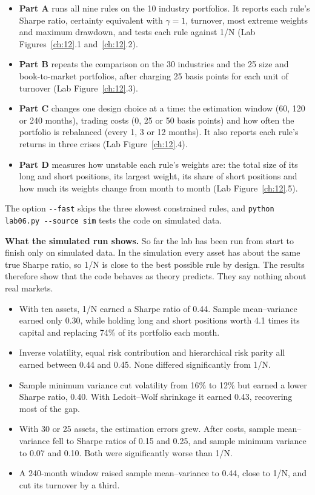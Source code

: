 \begin{itemize}
  \item \textbf{Part A} runs all nine rules on the 10 industry portfolios. It reports each rule's Sharpe ratio, certainty equivalent with $\gamma = 1$, turnover, most extreme weights and maximum drawdown, and tests each rule against 1/N (Lab Figures~\ref{ch:12}.1 and~\ref{ch:12}.2).
  \item \textbf{Part B} repeats the comparison on the 30 industries and the 25 size and book-to-market portfolios, after charging 25 basis points for each unit of turnover (Lab Figure~\ref{ch:12}.3).
  \item \textbf{Part C} changes one design choice at a time: the estimation window (60, 120 or 240 months), trading costs (0, 25 or 50 basis points) and how often the portfolio is rebalanced (every 1, 3 or 12 months). It also reports each rule's returns in three crises (Lab Figure~\ref{ch:12}.4).
  \item \textbf{Part D} measures how unstable each rule's weights are: the total size of its long and short positions, its largest weight, its share of short positions and how much its weights change from month to month (Lab Figure~\ref{ch:12}.5).
\end{itemize}

{\sloppy The option \texttt{-{}-fast} skips the three slowest constrained rules, and \texttt{python lab06.py -{}-source sim} tests the code on simulated data.\par}

\textbf{What the simulated run shows.} So far the lab has been run from start to finish only on simulated data. In the simulation every asset has about the same true Sharpe ratio, so 1/N is close to the best possible rule by design. The results therefore show that the code behaves as theory predicts. They say nothing about real markets.

\begin{itemize}
  \item With ten assets, 1/N earned a Sharpe ratio of 0.44. Sample mean--variance earned only 0.30, while holding long and short positions worth 4.1 times its capital and replacing 74\% of its portfolio each month.
  \item Inverse volatility, equal risk contribution and hierarchical risk parity all earned between 0.44 and 0.45. None differed significantly from 1/N.
  \item Sample minimum variance cut volatility from 16\% to 12\% but earned a lower Sharpe ratio, 0.40. With Ledoit--Wolf shrinkage it earned 0.43, recovering most of the gap.
  \item With 30 or 25 assets, the estimation errors grew. After costs, sample mean--variance fell to Sharpe ratios of 0.15 and 0.25, and sample minimum variance to 0.07 and 0.10. Both were significantly worse than 1/N.
  \item A 240-month window raised sample mean--variance to 0.44, close to 1/N, and cut its turnover by a third.
\end{itemize}

